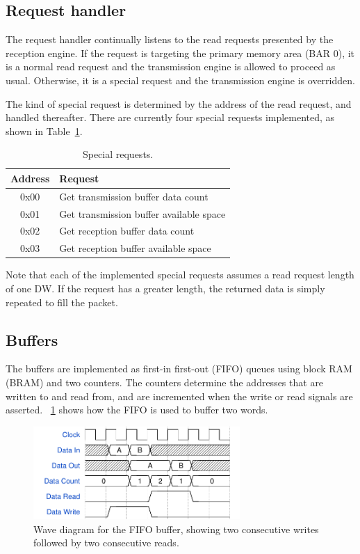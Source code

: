 \subsection{Request handler}

The request handler continually listens to the read requests presented by the reception engine.
If the request is targeting the primary memory area (BAR 0), it is a normal read request and the transmission engine is allowed to proceed as usual.
Otherwise, it is a special request and the transmission engine is overridden.

The kind of special request is determined by the address of the read request, and handled thereafter.
There are currently four special requests implemented, as shown in Table~\ref{tab:requests}.

\begin{table}[!ht]
    \renewcommand{\arraystretch}{1.3}
    \label{tab:requests}
    \centering
    \begin{tabular}{c|l}
        \bfseries Address & \bfseries Request \\
        \hline
        0x00 & Get transmission buffer data count \\
        0x01 & Get transmission buffer available space \\
        0x02 & Get reception buffer data count \\
        0x03 & Get reception buffer available space \\
    \end{tabular}
    \caption{Special requests.}
\end{table}

Note that each of the implemented special requests assumes a read request length of one DW.
If the request has a greater length, the returned data is simply repeated to fill the packet.

\subsection{Buffers}

The buffers are implemented as first-in first-out (FIFO) queues using block RAM (BRAM) and two counters.
The counters determine the addresses that are written to and read from, and are incremented when the write or read signals are asserted.
\figurename~\ref{fig:wavediagram-fifo} shows how the FIFO is used to buffer two words.

\begin{figure}[!ht]
    \centering
    \includegraphics[width=0.7\textwidth]{figures/wavediagram-fifo}
    \caption[FIFO buffer wave diagram]{
        Wave diagram for the FIFO buffer, showing two consecutive writes followed by two consecutive reads.
    }
    \label{fig:wavediagram-fifo}
\end{figure}

